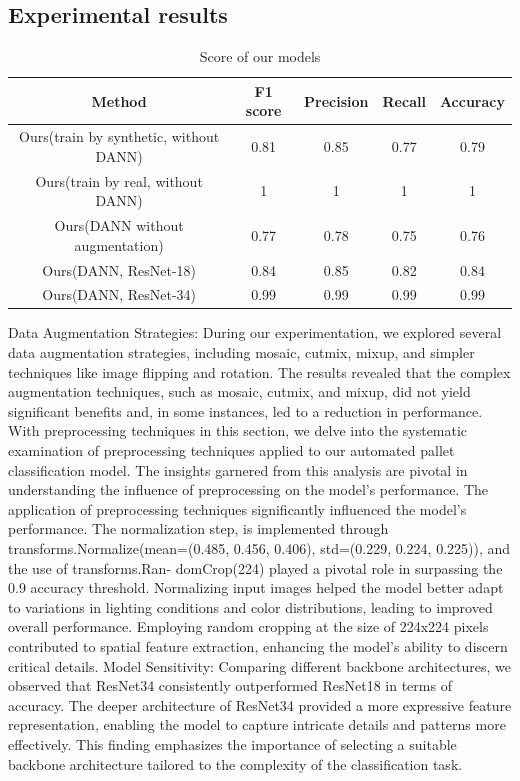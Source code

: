 \documentclass[sigconf,authordraft]{acmart}
\begin{document}
\subsection{Experimental results}
\noindent
\begin{table}
  \caption{Score of our models}
  \label{table Score of our models}
  \begin{tabular}{c|cccc}
    \toprule
    Method&F1 score&Precision&Recall&Accuracy\\
    \midrule
     Ours(train by synthetic, without DANN)&0.81&0.85&0.77&0.79\\
     Ours(train by real, without DANN)&1&1&1&1\\
     Ours(DANN without augmentation)&0.77&0.78&0.75&0.76\\ 
     Ours(DANN, ResNet-18)&0.84&0.85&0.82&0.84\\
     Ours(DANN, ResNet-34)&0.99&0.99&0.99&0.99\\
  \bottomrule
\end{tabular}
\end{table}
Data Augmentation Strategies:
During our experimentation, we explored several data augmentation strategies, including mosaic, cutmix, mixup, and simpler techniques like image flipping and rotation. The results revealed that the complex augmentation techniques, such as mosaic, cutmix, and mixup, did not yield significant benefits and, in some instances, led to a reduction in performance. With preprocessing techniques in this section, we delve into the systematic examination of preprocessing techniques applied to our automated pallet classification model. The insights garnered from this analysis are pivotal in understanding the influence of preprocessing on the model's performance. The application of preprocessing techniques significantly influenced the model's performance. The normalization step, is implemented through transforms.Normalize(mean=(0.485, 0.456, 0.406), std=(0.229, 0.224, 0.225)), and the use of transforms.Ran- domCrop(224) played a pivotal role in surpassing the 0.9 accuracy threshold. Normalizing input images helped the model better adapt to variations in lighting conditions and color distributions, leading to improved overall performance. Employing random cropping at the size of 224x224 pixels contributed to spatial feature extraction, enhancing the model's ability to discern critical details.
Model Sensitivity: Comparing different backbone architectures, we observed that ResNet34 consistently outperformed ResNet18 in terms of accuracy. The deeper architecture of ResNet34 provided a more expressive feature representation, enabling the model to capture intricate details and patterns more effectively. This finding emphasizes the importance of selecting a suitable backbone architecture tailored to the complexity of the classification task.
\end{document}
